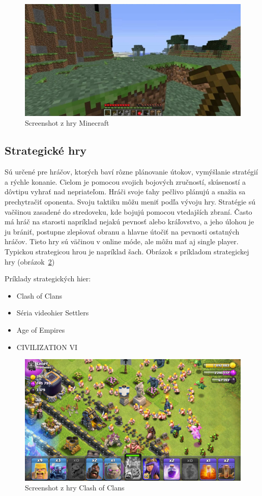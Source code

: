 \documentclass[10pt,oneside,slovak,a4paper]{article}
\begin{document}
\begin{figure}[tbh]
\centering
\includegraphics[scale=0.2]{minecraft.jpg}
\caption{Screenshot z hry Minecraft}
\label{f:minecraft}
\end{figure}

\subsection{Strategické hry} \label{zanre:strategicke}

Sú určené pre hráčov, ktorých baví rôzne plánovanie útokov, vymýšlanie stratégií a rýchle konanie. Cielom je pomocou svojich bojových zručností, skúseností a dôvtipu vyhrať nad nepriateľom. Hráči svoje ťahy pečlivo plánujú a snažia sa prechytračiť oponenta. Svoju taktiku môžu meniť podľa vývoju hry. Stratégie sú vačšinou zasadené do stredoveku, kde bojujú pomocou vtedajších zbraní. Často má hráč na starosti napríklad nejakú pevnosť alebo kráľovstvo, a jeho úlohou je ju brániť, postupne zlepšovať obranu a hlavne útočiť na pevnosti ostatných hráčov. Tieto hry sú väčinou v online móde, ale môžu mať aj single player.  Typickou strategicou hrou je napríklad šach. Obrázok s príkladom strategickej hry (obrázok~\ref{f:coc})

Príklady strategických hier:
\begin{itemize}
\item Clash of Clans
\item Séria videohier Settlers
\item Age of Empires
\item CIVILIZATION VI
\end{itemize}

\begin{figure}[tbh]
\centering
\includegraphics[scale=0.25]{coc.jpg}
\caption{Screenshot z hry Clash of Clans}
\label{f:coc}
\end{figure}
\end{document}
